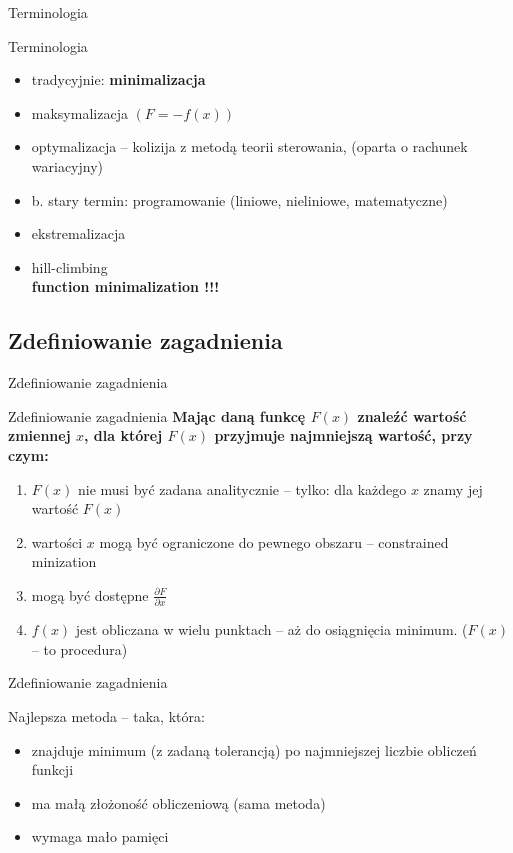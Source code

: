   \begin{frame}{Terminologia}
    \begin{block}{Terminologia}
      \begin{itemize}
        \item tradycyjnie: \textbf{minimalizacja}
        \item maksymalizacja $(F = -f(x))$
        \item optymalizacja -- kolizija z metodą teorii
        sterowania, (oparta o rachunek wariacyjny)
        \item b. stary termin: programowanie (liniowe,
        nieliniowe, matematyczne)
        \item ekstremalizacja
        \item hill-climbing \\
        \textbf{function minimalization !!!}
      \end{itemize}
    \end{block}
  \end{frame}

\subsection{Zdefiniowanie zagadnienia}

  \begin{frame}{Zdefiniowanie zagadnienia}
    \begin{block}{Zdefiniowanie zagadnienia}
      \textbf{Mając daną funkcę $ F(x) $ znaleźć wartość
      zmiennej $ x $, dla której $ F(x) $ przyjmuje
      najmniejszą wartość, przy czym:}
      \begin{enumerate}
        \item $ F(x) $ nie musi być zadana analitycznie --
        tylko: dla każdego $ x $ znamy jej wartość $ F(x) $
        \item wartości $ x $ mogą być ograniczone do pewnego
        obszaru -- constrained minization
        \item mogą być dostępne $ \frac{\partial F}{\partial x} $
        \item $ f(x) $ jest obliczana w wielu punktach --
        aż do osiągnięcia minimum. ($ F(x) $ -- to procedura)
      \end{enumerate}
    \end{block}
  \end{frame}

  \begin{frame}{Zdefiniowanie zagadnienia}
    \begin{block}{Najlepsza metoda -- taka, która:}
      \begin{itemize}
        \item znajduje minimum (z zadaną tolerancją)
        po najmniejszej liczbie obliczeń funkcji
        \item ma małą złożoność obliczeniową (sama
        metoda)
        \item wymaga mało pamięci
      \end{itemize}
    \end{block}
  \end{frame}

